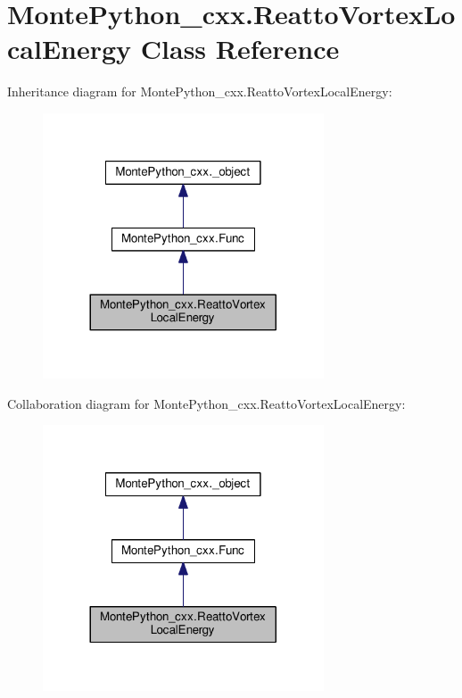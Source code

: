 \hypertarget{classMontePython__cxx_1_1ReattoVortexLocalEnergy}{}\section{Monte\+Python\+\_\+cxx.\+Reatto\+Vortex\+Local\+Energy Class Reference}
\label{classMontePython__cxx_1_1ReattoVortexLocalEnergy}


Inheritance diagram for Monte\+Python\+\_\+cxx.\+Reatto\+Vortex\+Local\+Energy\+:
\nopagebreak
\begin{figure}[H]
\begin{center}
\leavevmode
\includegraphics[width=236pt]{classMontePython__cxx_1_1ReattoVortexLocalEnergy__inherit__graph}
\end{center}
\end{figure}


Collaboration diagram for Monte\+Python\+\_\+cxx.\+Reatto\+Vortex\+Local\+Energy\+:
\nopagebreak
\begin{figure}[H]
\begin{center}
\leavevmode
\includegraphics[width=236pt]{classMontePython__cxx_1_1ReattoVortexLocalEnergy__coll__graph}
\end{center}
\end{figure}
